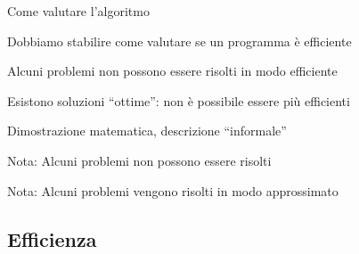 \begin{frame}{Come valutare l'algoritmo}

\BIL
\item Dobbiamo stabilire come valutare se un programma è efficiente
\item Alcuni problemi non possono essere risolti in modo efficiente
\item Esistono soluzioni “ottime”: non è possibile essere più efficienti
\EIL

\bigskip
{}
\BIL
\item  Dimostrazione matematica, descrizione “informale”
\item Nota: Alcuni problemi non possono essere risolti
\item Nota: Alcuni problemi vengono risolti in modo approssimato
\EIL

\end{frame}

\subsection{Efficienza}

